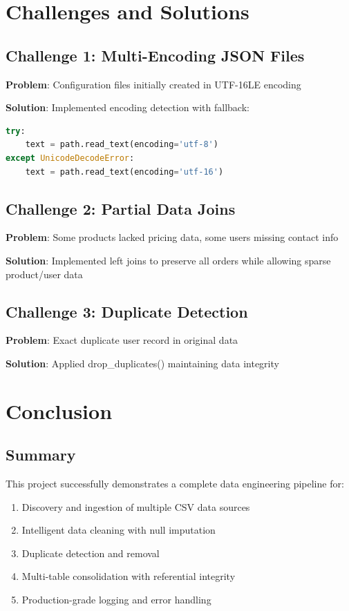 \documentclass[12pt,a4paper]{report}
\begin{document}
\chapter{Challenges and Solutions}

\section{Challenge 1: Multi-Encoding JSON Files}

\textbf{Problem}: Configuration files initially created in UTF-16LE encoding

\textbf{Solution}: Implemented encoding detection with fallback:
\begin{lstlisting}[language=Python]
try:
    text = path.read_text(encoding='utf-8')
except UnicodeDecodeError:
    text = path.read_text(encoding='utf-16')
\end{lstlisting}

\section{Challenge 2: Partial Data Joins}

\textbf{Problem}: Some products lacked pricing data, some users missing contact info

\textbf{Solution}: Implemented left joins to preserve all orders while allowing sparse product/user data

\section{Challenge 3: Duplicate Detection}

\textbf{Problem}: Exact duplicate user record in original data

\textbf{Solution}: Applied drop\_duplicates() maintaining data integrity

\chapter{Conclusion}

\section{Summary}

This project successfully demonstrates a complete data engineering pipeline for:
\begin{enumerate}
    \item Discovery and ingestion of multiple CSV data sources
    \item Intelligent data cleaning with null imputation
    \item Duplicate detection and removal
    \item Multi-table consolidation with referential integrity
    \item Production-grade logging and error handling
\end{enumerate}
\end{document}

